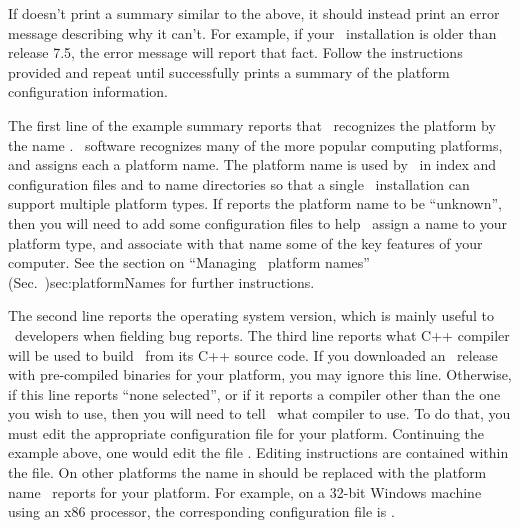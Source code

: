 If  doesn't print a summary similar to the
above, it should instead print an error message describing why it can't.
For example, if your \Tcl\ installation is older than release 7.5, the
error message will report that fact.  Follow the instructions provided
and repeat until  successfully prints a summary
of the platform configuration information.

The first line of the example summary reports that \OOMMF\ recognizes
the platform by the name .  \OOMMF\ software recognizes many
of the more popular computing platforms, and assigns each a platform
name.  The platform name is used by \OOMMF\ in index and configuration
files and to name directories so that a single \OOMMF\ installation can
support multiple platform types.  If  reports
the platform name to be ``unknown'', then you will need to add some
configuration files to help \OOMMF\ assign a name to your platform type,
and associate with that name some of the key features of your computer.
See the section on
{``Managing \OOMMF\ platform names'' (Sec.~}{)}{sec:platformNames}
for further instructions.

The second line reports the operating system version, which is mainly
useful to \OOMMF\ developers when fielding bug reports.  The third line
reports what C++ compiler will be used to build \OOMMF\ from its C++
source code.  If you downloaded an \OOMMF\ release with pre-compiled
binaries for your platform, you may ignore this line.  Otherwise, if
this line reports ``none selected'', or if it reports a compiler other
than the one you wish to use, then you will need to tell \OOMMF\ what
compiler to use.  To do that, you must edit the appropriate
configuration file for your platform.  Continuing the example above, one
would edit the file
.
Editing instructions are contained within the file.  On other platforms
the name  in 
should be replaced with the platform name \OOMMF\ reports for your
platform.  For example, on a 32-bit Windows machine using an x86
processor, the corresponding configuration file is
.

